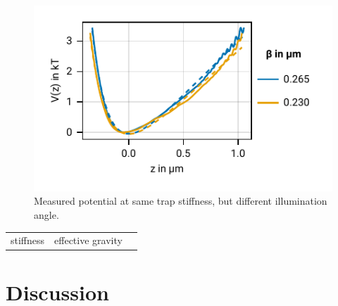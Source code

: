 \documentclass[
    twoside=false,
    twocolumn=true,
    fontsize=11pt,
]{scrarticle}
\begin{document}
\begin{figure}
    \centering
    \includegraphics{figures/02_06_01_different_beta.pdf}
    \caption{Measured potential at same trap stiffness, but different illumination angle.}
\end{figure}
\begin{table}
    \centering
    \begin{tabular}{r|l|l}
        stiffness   & effective gravity &
        
    \end{tabular}
\end{table}



\section{Discussion}

\nocite{*}
\printbibliography
\end{document}
